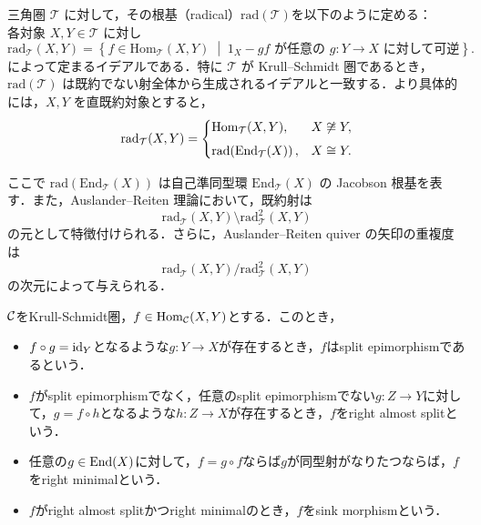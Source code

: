 \begin{defn}

三角圏 $\mathcal{T}$ に対して，その根基（radical）$\mathrm{rad}(\mathcal{T})$を以下のように定める：\\
各対象 $X,Y \in \mathcal{T}$ に対し
\[
\mathrm{rad}_{\mathcal{T}}(X,Y)
=
\left\{
f \in \mathrm{Hom}_{\mathcal{T}}(X,Y)
\;\middle|\;
1_X-gf \text{ が任意の } g:Y\to X \text{ に対して可逆}
\right\}.
\]
によって定まるイデアルである．特に $\mathcal{T}$ が Krull--Schmidt 圏であるとき，$\mathrm{rad}(\mathcal{T})$ は既約でない射全体から生成されるイデアルと一致する．より具体的には，$X,Y$ を直既約対象とすると，
\[
\mathrm{rad}_{\mathcal{T}}(X,Y)
=
\begin{cases}
\operatorname{\mathrm{Hom}}_{{\mathcal T}}(X,Y),
& X \not\cong Y,\\[4pt]
\mathrm{rad}\!\left(\operatorname{\mathrm{End}}_{{\mathcal T}}(X)\right),
& X \cong Y.
\end{cases}
\]

ここで
\(
\mathrm{rad}\!\left(\mathrm{End}_{\mathcal{T}}(X)\right)
\)
は自己準同型環
\(
\mathrm{End}_{\mathcal{T}}(X)
\)
の Jacobson 根基を表す．また，Auslander--Reiten 理論において，既約射は
\[
\mathrm{rad}_{\mathcal{T}}(X,Y)
\setminus
\mathrm{rad}_{\mathcal{T}}^{2}(X,Y)
\]
の元として特徴付けられる．さらに，Auslander--Reiten quiver の矢印の重複度は
\[
\mathrm{rad}_{\mathcal{T}}(X,Y)
\Big/
\mathrm{rad}_{\mathcal{T}}^{2}(X,Y)
\]
の次元によって与えられる．
\end{defn}
\begin{defn}\cite{Hap88}
	${\mathcal C}$をKrull-Schmidt圏，$f\in\operatorname{\mathrm{Hom}}_{{\mathcal C}}(X,Y)$とする．このとき，\vspace{-3mm}
	\begin{itemize}
		\item[(1)]
			$f\circ g = \mathrm{id}_Y$となるような$g\colon Y\to X$が存在するとき，$f$はsplit epimorphismであるという．
		\item[(2)]
			$f$がsplit epimorphismでなく，任意のsplit epimorphismでない$g\colon Z\to Y$に対して，$g = f\circ h$となるような$h\colon Z\to X$が存在するとき，$f$をright almost splitという．
		\item[(3)]
			任意の$g\in\operatorname{\mathrm{End}}(X)$に対して，$f=g\circ f$ならば$g$が同型射がなりたつならば，$f$をright minimalという．
		\item[(4)]
			$f$がright almost splitかつright minimalのとき，$f$をsink morphismという．
	\end{itemize}
\end{defn}

\begin{lemm}
	
\end{lemm}

